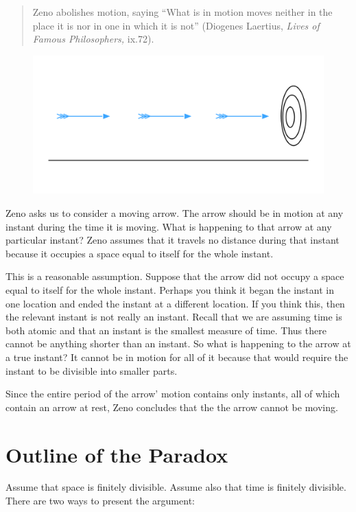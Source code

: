 \documentclass[oneside]{article}
\begin{document}
\begin{quote}
Zeno abolishes motion, saying ``What is in motion moves neither in the
place it is nor in one in which it is not'' (Diogenes Laertius, \emph{Lives of
Famous Philosophers,} ix.72).
\end{quote}
\begin{figure}[h]
  \includegraphics[width=\linewidth]{arrow.png}
\end{figure}
Zeno asks us to consider a moving arrow. The arrow should be in motion at any instant during the time it is moving. What is happening to that arrow at any particular instant? Zeno assumes that it travels no distance during that instant because it occupies a space equal to itself  for the whole instant. 

This is a reasonable assumption. Suppose that the arrow did not occupy a space equal to itself for the whole instant. Perhaps you think it began the instant in one location and ended the instant at a different location. If you think this, then the relevant instant is not really an instant. Recall that we are assuming time is both atomic and that an instant is the smallest measure of time. Thus there cannot be anything shorter than an instant. So what is happening to the arrow at a true instant? It cannot be in motion for all of it because that would require the instant to be divisible into smaller parts.   

Since the entire period of the arrow' motion contains only instants, all of which contain an arrow at rest, Zeno concludes that the the arrow cannot be moving.

\section*{Outline of the Paradox}\label{outline-of-the-paradox}

Assume that space is finitely divisible. Assume also that time is finitely divisible. There are two ways to present the argument:\\
\end{document}
